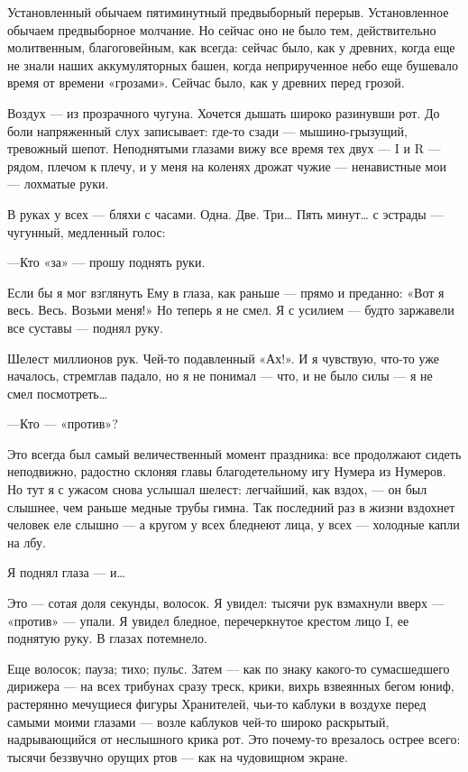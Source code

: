 \documentclass[11pt,openany]{book}
\begin{document}
Установленный обычаем пятиминутный предвыборный перерыв. Установленное обычаем предвыборное молчание. Но сейчас оно не было тем, действительно молитвенным, благоговейным, как всегда: сейчас было, как у древних, когда еще не знали наших аккумуляторных башен, когда неприрученное небо еще бушевало время от времени «грозами». Сейчас было, как у древних перед грозой.

Воздух --- из прозрачного чугуна. Хочется дышать широко разинувши рот. До боли напряженный слух записывает: где-то сзади --- мышино-грызущий, тревожный шепот. Неподнятыми глазами вижу все время тех двух --- I и R --- рядом, плечом к плечу, и у меня на коленях дрожат чужие --- ненавистные мои --- лохматые руки.

В руках у всех --- бляхи с часами. Одна. Две. Три\ldots{} Пять минут\ldots{} с эстрады --- чугунный, медленный голос:

---Кто «за» --- прошу поднять руки.

Если бы я мог взглянуть Ему в глаза, как раньше --- прямо и преданно: «Вот я весь. Весь. Возьми меня!» Но теперь я не смел. Я с усилием --- будто заржавели все суставы --- поднял руку.

Шелест миллионов рук. Чей-то подавленный «Ах!». И я чувствую, что-то уже началось, стремглав падало, но я не понимал --- что, и не было силы --- я не смел посмотреть\ldots{}

---Кто --- «против»?

Это всегда был самый величественный момент праздника: все продолжают сидеть неподвижно, радостно склоняя главы благодетельному игу Нумера из Нумеров. Но тут я с ужасом снова услышал шелест: легчайший, как вздох, --- он был слышнее, чем раньше медные трубы гимна. Так последний раз в жизни вздохнет человек еле слышно --- а кругом у всех бледнеют лица, у всех --- холодные капли на лбу.

Я поднял глаза --- и\ldots{}

Это --- сотая доля секунды, волосок. Я увидел: тысячи рук взмахнули вверх --- «против» --- упали. Я увидел бледное, перечеркнутое крестом лицо I, ее поднятую руку. В глазах потемнело.

Еще волосок; пауза; тихо; пульс. Затем --- как по знаку какого-то сумасшедшего дирижера --- на всех трибунах сразу треск, крики, вихрь взвеянных бегом юниф, растерянно мечущиеся фигуры Хранителей, чьи-то каблуки в воздухе перед самыми моими глазами --- возле каблуков чей-то широко раскрытый, надрывающийся от неслышного крика рот. Это почему-то врезалось острее всего: тысячи беззвучно орущих ртов --- как на чудовищном экране.
\end{document}
